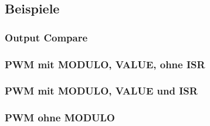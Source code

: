 \newpage
\subsection{Beispiele}

\subsubsection{Output Compare}

\newpage
\subsubsection{PWM mit MODULO, VALUE, ohne ISR}


\newpage
\subsubsection{PWM mit MODULO, VALUE und ISR}


\newpage
\subsubsection{PWM ohne MODULO}

